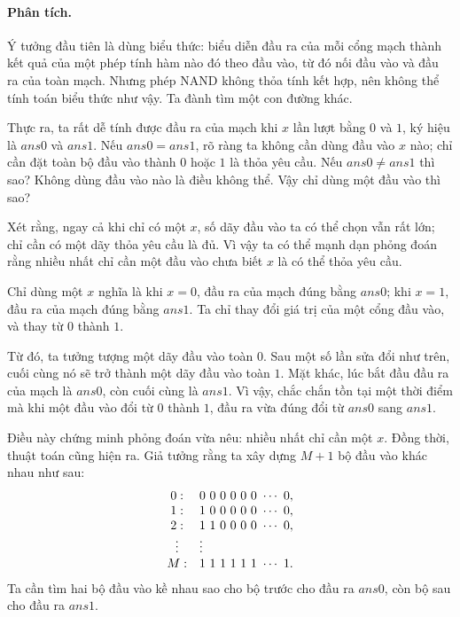 \documentclass[11pt]{article}
\begin{document}
\paragraph{Phân tích.}
Ý tưởng đầu tiên là dùng biểu thức: biểu diễn đầu ra của mỗi cổng mạch thành
kết quả của một phép tính hàm nào đó theo đầu vào, từ đó nối đầu vào và đầu ra
của toàn mạch. Nhưng phép NAND không thỏa tính kết hợp, nên không thể tính
toán biểu thức như vậy. Ta đành tìm một con đường khác.

Thực ra, ta rất dễ tính được đầu ra của mạch khi $x$ lần lượt bằng $0$ và
$1$, ký hiệu là $\mathit{ans0}$ và $\mathit{ans1}$. Nếu
$\mathit{ans0}=\mathit{ans1}$, rõ ràng ta không cần dùng đầu vào $x$ nào; chỉ
cần đặt toàn bộ đầu vào thành $0$ hoặc $1$ là thỏa yêu cầu. Nếu
$\mathit{ans0}\ne\mathit{ans1}$ thì sao? Không dùng đầu vào nào là điều không
thể. Vậy chỉ dùng một đầu vào thì sao?

Xét rằng, ngay cả khi chỉ có một $x$, số dãy đầu vào ta có thể chọn vẫn rất
lớn; chỉ cần có một dãy thỏa yêu cầu là đủ. Vì vậy ta có thể mạnh dạn phỏng
đoán rằng nhiều nhất chỉ cần một đầu vào chưa biết $x$ là có thể thỏa yêu
cầu.

Chỉ dùng một $x$ nghĩa là khi $x=0$, đầu ra của mạch đúng bằng $\mathit{ans0}$;
khi $x=1$, đầu ra của mạch đúng bằng $\mathit{ans1}$. Ta chỉ thay đổi giá trị
của một cổng đầu vào, và thay từ $0$ thành $1$.

Từ đó, ta tưởng tượng một dãy đầu vào toàn $0$. Sau một số lần sửa đổi như
trên, cuối cùng nó sẽ trở thành một dãy đầu vào toàn $1$. Mặt khác, lúc bắt
đầu đầu ra của mạch là $\mathit{ans0}$, còn cuối cùng là $\mathit{ans1}$. Vì
vậy, chắc chắn tồn tại một thời điểm mà khi một đầu vào đổi từ $0$ thành $1$,
đầu ra vừa đúng đổi từ $\mathit{ans0}$ sang $\mathit{ans1}$.

Điều này chứng minh phỏng đoán vừa nêu: nhiều nhất chỉ cần một $x$. Đồng thời,
thuật toán cũng hiện ra. Giả tưởng rằng ta xây dựng $M+1$ bộ đầu vào khác
nhau như sau:
\[
\begin{array}{c@{\quad}l}
0: & 0\ 0\ 0\ 0\ 0\ 0\ \cdots\ 0,\\
1: & 1\ 0\ 0\ 0\ 0\ 0\ \cdots\ 0,\\
2: & 1\ 1\ 0\ 0\ 0\ 0\ \cdots\ 0,\\
\vdots & \vdots\\
M: & 1\ 1\ 1\ 1\ 1\ 1\ \cdots\ 1.
\end{array}
\]
Ta cần tìm hai bộ đầu vào kề nhau sao cho bộ trước cho đầu ra
$\mathit{ans0}$, còn bộ sau cho đầu ra $\mathit{ans1}$.
\end{document}
